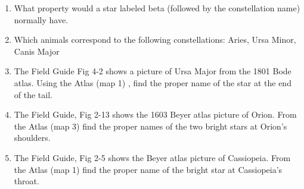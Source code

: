 \begin{enumerate}
\item
What property would a star labeled beta (followed by the constellation
name) normally have.

\item Which animals correspond to the following constellations: Aries,
Ursa Minor, Canis Major

\item 
The Field Guide Fig 4-2 shows a picture of  Ursa Major from the
1801 Bode atlas.   Using the Atlas (map 1) , find the proper name
of the star at the end of the tail.

\item 
The Field Guide, Fig 2-13 shows the 1603 Beyer atlas picture of Orion. From
the Atlas (map 3) find the proper names of the two bright stars at
Orion's shoulders.

\item 
The Field Guide, Fig 2-5 shows the Beyer atlas picture of Cassiopeia. From
the Atlas (map 1) find the proper name of the  bright star at
Cassiopeia's throat.

\end{enumerate} 













